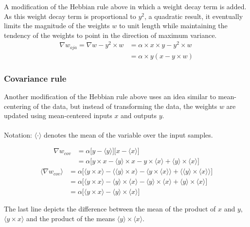 \documentclass[main]{subfiles}
\begin{document}
A modification of the Hebbian rule above in which a weight decay term is added. As this weight decay term is proportional to $y^2$, a quadratic result, it eventually limits the magnitude of the weights $w$ to unit length while maintaining the tendency of the weights to point in the direction of maximum variance.
\begin{align}
    \nabla w_{oja} = \nabla w - y^2 \times w &= \alpha \times x \times y - y^2 \times w\\
        &= \alpha \times y (x - y \times w)
\end{align}

\subsubsection{Covariance rule}

Another modification of the Hebbian rule above uses an idea similar to mean-centering of the data, but instead of transforming the data, the weights $w$ are updated using mean-centered inputs $x$ and outputs $y$.
\\ \\
Notation: $\langle \cdot \rangle$ denotes the mean of the variable over the input samples.

\begin{align}
    \nabla w_{cov} &= \alpha \big[y - \langle y\rangle\big]\big[x - \langle x\rangle\big]\\
        &= \alpha \big[y \times x - \langle y\rangle \times x - y \times \langle x\rangle + \langle y\rangle \times \langle x\rangle\big]
\end{align}
\begin{align}
    \langle \nabla w_{cov}\rangle &= \alpha \big[\langle y \times x\rangle - \langle \langle y\rangle \times x\rangle - \langle y \times \langle x\rangle\rangle + \langle \langle y\rangle \times \langle x\rangle\rangle\big]\\
    &= \alpha \big[\langle y \times x\rangle - \langle y\rangle \times \langle x\rangle - \langle y\rangle \times \langle x\rangle + \langle y\rangle \times \langle x\rangle\big]\\
    &= \alpha \big[\langle y \times x\rangle - \langle y\rangle \times \langle x\rangle\big]
\end{align}

The last line depicts the difference between the mean of the product of $x$ and $y$, $\langle y \times x\rangle$ and the product of the means $\langle y\rangle \times \langle x\rangle$.
\end{document}
